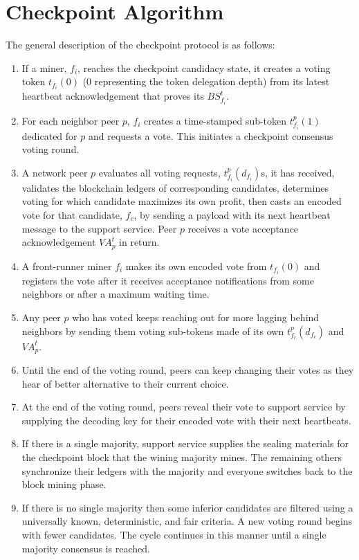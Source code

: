 \section{Checkpoint Algorithm}
\label{s-algorithm}
The general description of the checkpoint protocol is as follows:
\begin{enumerate}
\item If a miner, $f_i$, reaches the checkpoint candidacy state, it creates a voting token $t_{f_i}(0)$ (0 representing the token delegation depth) from its latest heartbeat acknowledgement that proves its  $BS_{f_i}^t$.
\item For each neighbor peer $p$, $f_i$ creates a time-stamped sub-token $t_{f_i}^{p}(1)$ dedicated for $p$ and requests a vote. This initiates a checkpoint consensus voting round.
\item A network peer $p$ evaluates all voting requests, $t_{f_i}^{p}(d_{f_i})$s, it has received, validates the blockchain ledgers of corresponding candidates, determines voting for which candidate maximizes its own profit, then casts an encoded vote for that candidate, $f_c$, by sending a payload with its next heartbeat message to the support service. Peer $p$ receives a vote acceptance acknowledgement $VA_p^t$ in return.
\item A front-runner miner $f_i$ makes its own encoded vote from $t_{f_i}(0)$ and registers the vote after it receives acceptance notifications from some neighbors or after a maximum waiting time.
\item Any peer $p$ who has voted keeps reaching out for more lagging behind neighbors by sending them voting sub-tokens made of its own $t_{f_c}^{p}(d_{f_c})$ and $VA_p^t$.
\item Until the end of the voting round, peers can keep changing their votes as they hear of better alternative to their current choice.   
\item At the end of the voting round, peers reveal their vote to support service by supplying the decoding key for their encoded vote with their next heartbeats.
\item If there is a single majority, support service supplies the sealing materials for the checkpoint block that the wining majority mines. The remaining others synchronize their ledgers with the majority and everyone switches back to the block mining phase.
\item If there is no single majority then some inferior candidates are filtered using a universally known, deterministic, and fair criteria. A new voting round begins with fewer candidates. The cycle continues in this manner until a single majority consensus is reached.                              
\end{enumerate}


